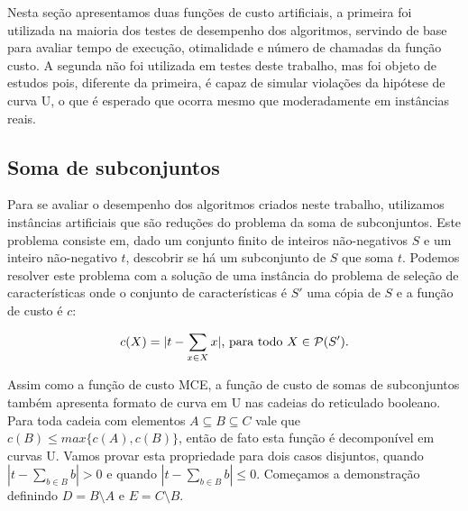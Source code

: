 Nesta seção apresentamos duas funções de custo artificiais, a primeira 
foi utilizada na maioria dos testes de desempenho dos algoritmos, 
servindo de base para avaliar tempo de execução, otimalidade e número de 
chamadas da função custo. A segunda não foi utilizada em testes deste
trabalho, mas foi objeto de estudos pois, diferente da primeira, é capaz
de simular violações da hipótese de curva U, o que é esperado que ocorra
mesmo que moderadamente em instâncias reais.

\subsection{Soma de subconjuntos}
Para se avaliar o desempenho dos algoritmos criados neste trabalho, 
utilizamos instâncias artificiais que são reduções do problema da soma
de subconjuntos. Este problema consiste em, dado um conjunto finito de
inteiros não-negativos $S$ e um inteiro não-negativo $t$, descobrir se
há um subconjunto de $S$ que soma $t$. Podemos resolver este problema 
com a solução de uma instância do problema de seleção de características
onde o conjunto de características é $S'$ uma cópia de $S$ e a função de
custo é $c$:

\begin{equation*} \label{cost_function:subset_sum}
    c (X) = |t - \sum_{x \in X} x| \text{, para todo } 
                                        X \in \mathcal{P}(S') \text{.}
\end{equation*}

Assim como a função de custo MCE, a função de custo de somas de 
subconjuntos também apresenta formato de curva em U nas cadeias
do reticulado booleano. Para toda cadeia com elementos $A \subseteq B 
\subseteq C$ vale que $c (B) \leq max\{c (A), c (B)\}$, então de fato 
esta função é decomponível em curvas U. Vamos provar 
esta propriedade para dois casos disjuntos, quando $|t - \sum_{b \in B}
b| > 0$ e quando $|t - \sum_{b \in B} b| \leq 0$. Começamos a 
demonstração definindo $D = B \setminus A$ e $E = C \setminus B$.

